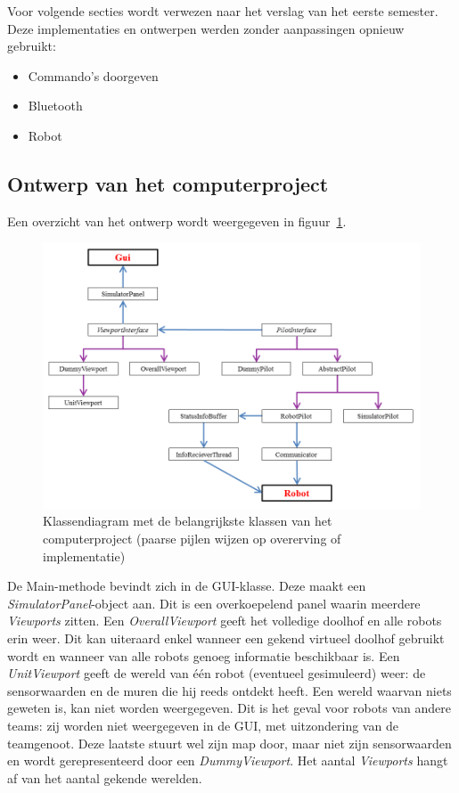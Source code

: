 \documentclass[tt2]{penoverslag}
\begin{document}
Voor volgende secties wordt verwezen naar het verslag van het eerste semester. Deze implementaties en ontwerpen werden zonder aanpassingen opnieuw gebruikt:

\begin{itemize}
\item Commando's doorgeven
\item Bluetooth
\item Robot
\end{itemize}

\subsection{Ontwerp van het computerproject}
\label{ssec:Sdesign}
Een overzicht van het ontwerp wordt weergegeven in figuur~\ref{fig:klasSoft}.\\

\begin{figure}
\centering
		\includegraphics[width=\textwidth]{KlasSoftware}
\caption[Klassendiagram computerproject]{Klassendiagram met de belangrijkste klassen van het computerproject (paarse pijlen wijzen op overerving of implementatie)}
\label{fig:klasSoft}
\end{figure}

De Main-methode bevindt zich in de GUI-klasse. Deze maakt een \textit{SimulatorPanel}-object aan. Dit is een overkoepelend panel waarin meerdere \textit{Viewports} zitten. Een \textit{OverallViewport} geeft het volledige doolhof en alle robots erin weer. Dit kan uiteraard enkel wanneer een gekend virtueel doolhof gebruikt wordt en wanneer van alle robots genoeg informatie beschikbaar is. Een \textit{UnitViewport} geeft de wereld van \'e\'en robot (eventueel gesimuleerd) weer: de sensorwaarden en de muren die hij reeds ontdekt heeft. Een wereld waarvan niets geweten is, kan niet worden weergegeven. Dit is het geval voor robots van andere teams: zij worden niet weergegeven in de GUI, met uitzondering van de teamgenoot. Deze laatste stuurt wel zijn map door, maar niet zijn sensorwaarden en wordt gerepresenteerd door een \textit{DummyViewport}. Het aantal \textit{Viewports} hangt af van het aantal gekende werelden.\\
\end{document}
